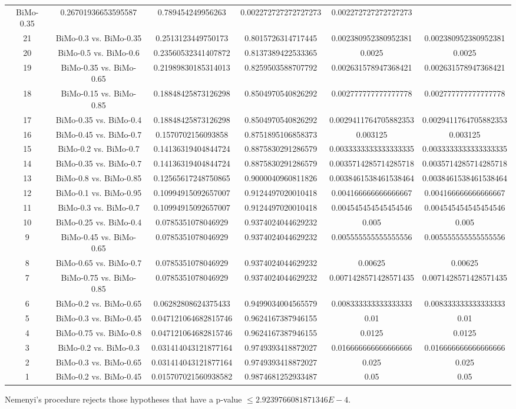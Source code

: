 \documentclass[a4paper,10pt]{article}
\begin{document}
\begin{landscape}
\begin{table}[!htp]
\begin{tabular}{cccccc}
BiMo-0.35&0.26701936653595587&0.789454249956263&0.002272727272727273&0.002272727272727273\\21&BiMo-0.3 vs. BiMo-0.35&0.2513123449750173&0.8015726314717445&0.002380952380952381&0.002380952380952381\\20&BiMo-0.5 vs. BiMo-0.6&0.23560532341407872&0.8137389422533365&0.0025&0.0025\\19&BiMo-0.35 vs. BiMo-0.65&0.21989830185314013&0.8259503588707792&0.002631578947368421&0.002631578947368421\\18&BiMo-0.15 vs. BiMo-0.85&0.18848425873126298&0.8504970540826292&0.002777777777777778&0.002777777777777778\\17&BiMo-0.35 vs. BiMo-0.4&0.18848425873126298&0.8504970540826292&0.0029411764705882353&0.0029411764705882353\\16&BiMo-0.45 vs. BiMo-0.7&0.1570702156093858&0.8751895106858373&0.003125&0.003125\\15&BiMo-0.2 vs. BiMo-0.7&0.14136319404844724&0.8875830291286579&0.0033333333333333335&0.0033333333333333335\\14&BiMo-0.35 vs. BiMo-0.7&0.14136319404844724&0.8875830291286579&0.0035714285714285718&0.0035714285714285718\\13&BiMo-0.8 vs. BiMo-0.85&0.12565617248750865&0.9000040960811826&0.0038461538461538464&0.0038461538461538464\\12&BiMo-0.1 vs. BiMo-0.95&0.10994915092657007&0.9124497020010418&0.004166666666666667&0.004166666666666667\\11&BiMo-0.3 vs. BiMo-0.7&0.10994915092657007&0.9124497020010418&0.004545454545454546&0.004545454545454546\\10&BiMo-0.25 vs. BiMo-0.4&0.0785351078046929&0.9374024044629232&0.005&0.005\\9&BiMo-0.45 vs. BiMo-0.65&0.0785351078046929&0.9374024044629232&0.005555555555555556&0.005555555555555556\\8&BiMo-0.65 vs. BiMo-0.7&0.0785351078046929&0.9374024044629232&0.00625&0.00625\\7&BiMo-0.75 vs. BiMo-0.85&0.0785351078046929&0.9374024044629232&0.0071428571428571435&0.0071428571428571435\\6&BiMo-0.2 vs. BiMo-0.65&0.06282808624375433&0.9499034004565579&0.008333333333333333&0.008333333333333333\\5&BiMo-0.3 vs. BiMo-0.45&0.047121064682815746&0.9624167387946155&0.01&0.01\\4&BiMo-0.75 vs. BiMo-0.8&0.047121064682815746&0.9624167387946155&0.0125&0.0125\\3&BiMo-0.2 vs. BiMo-0.3&0.031414043121877164&0.9749393418872027&0.016666666666666666&0.016666666666666666\\2&BiMo-0.3 vs. BiMo-0.65&0.031414043121877164&0.9749393418872027&0.025&0.025\\1&BiMo-0.2 vs. BiMo-0.45&0.015707021560938582&0.9874681252933487&0.05&0.05\\\hline
\end{tabular}
\end{table}
Nemenyi's procedure rejects those hypotheses that have a p-value $\le2.9239766081871346E-4$.



\end{landscape}
\end{document}
